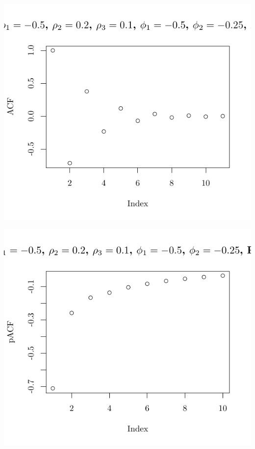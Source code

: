 \documentclass[10pt]{paper}\usepackage[]{graphicx}\usepackage[]{color}
\makeatletter
\def\maxwidth{ %
  \ifdim\Gin@nat@width>\linewidth
    \linewidth
  \else
    \Gin@nat@width
  \fi
}
\newenvironment{knitrout}{}{} %
\makeatother
\begin{document}
\begin{knitrout}
{\centering \includegraphics[width=\maxwidth]{figure/graphics-plotter-169} 

}




{\centering \includegraphics[width=\maxwidth]{figure/graphics-plotter-170} 

}





\end{knitrout}
\end{document}
